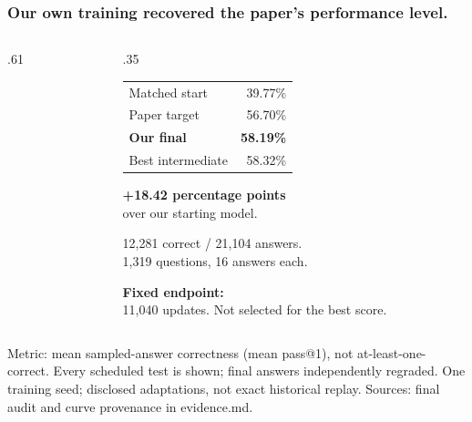 \documentclass[aspectratio=169,11pt]{beamer}
\newcommand{\source}[1]{\vfill{\scriptsize\color{Gray}#1\par}}
\begin{document}
\begin{frame}[t]
\frametitle{Our own training recovered the paper's performance level.}
\begin{columns}[T,onlytextwidth]
\begin{column}{.61\textwidth}
\end{column}
\begin{column}{.35\textwidth}
\small
\begin{tabular}{@{}lr@{}}
Matched start & 39.77\%\\
Paper target & 56.70\%\\
\textbf{Our final} & \textbf{58.19\%}\\
Best intermediate & 58.32\%\\
\end{tabular}
\medskip

\textbf{+18.42 percentage points}\\
over our starting model.
\medskip

12,281 correct / 21,104 answers.\\
1,319 questions, 16 answers each.
\medskip

\textbf{Fixed endpoint:}\\
11,040 updates. Not selected for the best score.
\end{column}
\end{columns}
\source{Metric: mean sampled-answer correctness (mean pass@1), not at-least-one-correct. Every scheduled test is shown; final answers independently regraded. One training seed; disclosed adaptations, not exact historical replay. Sources: final audit and curve provenance in evidence.md.}
\end{frame}
\end{document}
